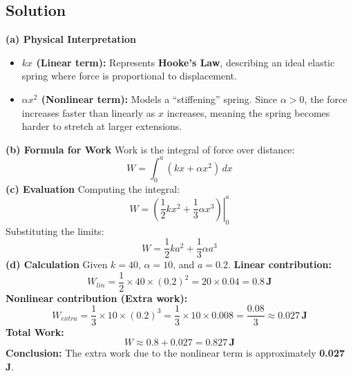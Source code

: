 \subsection*{Solution}
\textbf{(a) Physical Interpretation}
\begin{itemize}
    \item \textbf{$kx$ (Linear term):} Represents \textbf{Hooke's Law}, describing an ideal elastic spring where force is proportional to displacement.
    \item \textbf{$\alpha x^2$ (Nonlinear term):} Models a ``stiffening'' spring. Since $\alpha > 0$, the force increases faster than linearly as $x$ increases, meaning the spring becomes harder to stretch at larger extensions.
\end{itemize}
\textbf{(b) Formula for Work}
Work is the integral of force over distance:
\[ 
W = \int_{0}^{a} (kx + \alpha x^2) \, dx 
\]
\textbf{(c) Evaluation}
Computing the integral:
\[ 
W = \left. \left( \frac{1}{2}kx^2 + \frac{1}{3}\alpha x^3 \right) \right|_{0}^{a}\]
Substituting the limits:
\[ 
W = \frac{1}{2}ka^2 + \frac{1}{3}\alpha a^3 
\]
\textbf{(d) Calculation}
Given $k = 40$, $\alpha = 10$, and $a = 0.2$.
\textbf{Linear contribution:}
\[ 
W_{lin} = \frac{1}{2} \times 40 \times (0.2)^2 = 20 \times 0.04 = \mathbf{0.8 \, J} 
\]
\textbf{Nonlinear contribution (Extra work):}
\[ 
W_{extra} = \frac{1}{3} \times 10 \times (0.2)^3 = \frac{1}{3} \times 10 \times 0.008 = \frac{0.08}{3} \approx \mathbf{0.027 \, J} 
\]
\textbf{Total Work:}
\[ 
W \approx 0.8 + 0.027 = \mathbf{0.827 \, J} 
\]
\textbf{Conclusion:} The extra work due to the nonlinear term is approximately \textbf{0.027 J}.
\pagebreak